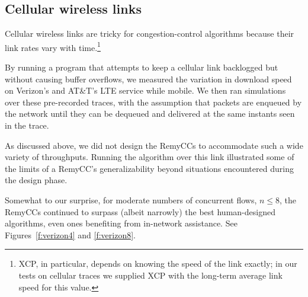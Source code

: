 \subsection{Cellular wireless links}

Cellular wireless links are tricky for congestion-control algorithms
because their link rates vary with time.\footnote{XCP, in particular,
  depends on knowing the speed of the link exactly; in our tests on cellular
  traces we supplied XCP with the long-term average link speed for
  this value.}

By running a program that attempts to keep a cellular link backlogged
but without causing buffer overflows, we measured the variation in
download speed on Verizon's and AT\&T's LTE service while mobile. We
then ran simulations over these pre-recorded traces, with the
assumption that packets are enqueued by the network until they can be
dequeued and delivered at the same instants seen in the trace.

%
%
%
%

As discussed above, we did not design the RemyCCs to accommodate such a wide
variety of throughputs. Running the algorithm over this link
illustrated some of the limits of a RemyCC's generalizability beyond
situations encountered during the design phase.

Somewhat to our surprise, for moderate numbers of concurrent flows, $n
\le 8$, the RemyCCs continued to surpass (albeit narrowly) the best
human-designed algorithms, even ones benefiting from in-network
assistance. See Figures~\ref{f:verizon4} and \ref{f:verizon8}.



